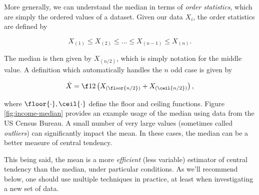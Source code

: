 \documentclass[../primer.tex]{subfiles}
\begin{document}
More generally, we can understand the median in terms of \emph{order
  statistics}, which are simply the ordered values of a dataset. Given our data
$X_i$, the order statistics are defined by

\begin{equation} \label{eq:def-order}
  X_{(1)} \leq X_{(2)} \leq \dots \leq X_{(n-1)} \leq X_{(n)}.
\end{equation}

\noindent The median is then given by $X_{(n/2)}$, which is simply notation for
the middle value. A definition which automatically handles the $n$ odd case is
given by

\begin{equation} \label{eq:def-sample-median}
  \tilde{X} = \f12\left(X_{(\floor{n/2})} + X_{(\ceil{n/2})}\right),
\end{equation}

\noindent where $\floor{\cdot}, \ceil{\cdot}$ define the floor and ceiling
functions. Figure \ref{fig:income-median} provides an example usage of the
median using data from the US Census Bureau. A small number of very large values
(sometimes called \emph{outliers}) can significantly impact the mean. In these
cases, the median can be a better measure of central tendency.

This being said, the mean is a more \emph{efficient} (less variable) estimator
of central tendency than the median, under particular
conditions.\cite{mosteller1977data} As we'll recommend below, one should use
multiple techniques in practice, at least when investigating a new set of data.
\end{document}
